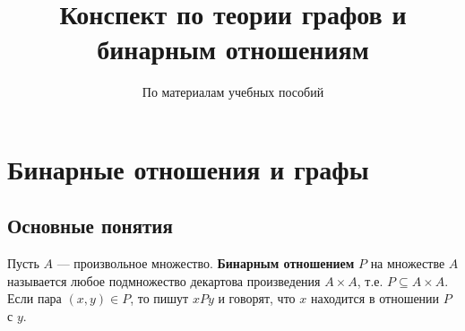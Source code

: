 \documentclass[12pt]{article}
\title{Конспект по теории графов и бинарным отношениям}
\author{По материалам учебных пособий}
\date{}
\begin{document}
\maketitle
\tableofcontents
\newpage

\section{Бинарные отношения и графы}
\subsection{Основные понятия}
Пусть \(A\) — произвольное множество. \textbf{Бинарным отношением} \(P\) на множестве \(A\) называется любое подмножество декартова произведения \(A \times A\), т.е. \(P \subseteq A \times A\). Если пара \((x,y) \in P\), то пишут \(xPy\) и говорят, что \(x\) находится в отношении \(P\) с \(y\).
\end{document}
